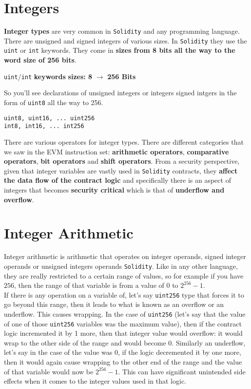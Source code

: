 \section{Integers}
\textbf{Integer types} are very common in \texttt{Solidity} and any programming language. There are unsigned and signed integers of various sizes. In \texttt{Solidity} they use the \texttt{uint} or \texttt{int} keywords. They come in \textbf{sizes from 8 bits all the way to the word size of 256 bits}.

\begin{center}
\texttt{uint}/\texttt{int} \textbf{keywords} 
\textbf{sizes: 8 }$\rightarrow$\textbf{ 256 Bits}
\end{center}

So you'll see declarations of unsigned integers or integers signed intgers in the form of \texttt{uint8} all the way to 256.

\begin{lstlisting}[style=defaultStyle, caption={Examples of different \textbf{int} and \textbf{uint} sizes.}]
uint8, uint16, ... uint256 
int8, int16, ... int256
\end{lstlisting}

There are various operators for integer types. There are different categories that we saw in the EVM instruction set: \textbf{arithmetic operators}, \textbf{comparative operators}, \textbf{bit operators} and \textbf{shift operators}.  From a security perspective, given that integer variables are vastly used in \texttt{Solidity} contracts, they \textbf{affect the data flow of the contract logic} and specifically there is an aspect of integers that becomes \textbf{security critical} which is that of \textbf{underflow and overflow}.

\section{Integer Arithmetic}
Integer arithmetic is arithmetic that operates on integer operands, signed integer operands or unsigned integers operands \texttt{Solidity}. Like in any other language, they are really restricted to a certain range of values, so for example if you have $256$, then the range of that variable is from a value of $0$ to $2^{256} - 1$.\\ 

If there is any operation on a variable of, let's say \texttt{uint256} type that forces it to go beyond this range, then it leads to what is known as an overflow or an underflow. This causes wrapping. In the case of \texttt{uint256} (let's say that the value of one of those \texttt{uint256} variables was the maximum value), then if the contract logic incremented it by 1 more, then that integer value would overflow: it would wrap to the other side of the range and would become 0. Similarly an underflow, let's say in the case of the value was 0, if the logic decremented it by one more, then it would again cause wrapping to the other end of the range and the value of that variable would now be $2^{256} - 1$. This can have significant unintended side effects when it comes to the integer values used in that logic.\\

